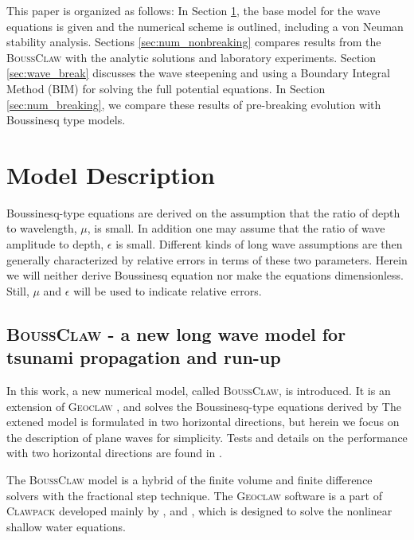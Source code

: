 \documentclass[review]{elsarticle}
\newcommand{\BoussClaw}{\textsc{BoussClaw} }
\newcommand{\BoussClawt}{\textsc{BoussClaw}}
\begin{document}
This paper is organized as follows: In Section \ref{sec:model}, the base model
for the wave equations is given and the numerical scheme is outlined, including a von Neuman stability analysis. 
Sections \ref{sec:num_nonbreaking} compares results from the \BoussClaw with
the analytic solutions and laboratory experiments. 
Section \ref{sec:wave_break} discusses the wave steepening and using a Boundary Integral Method (BIM) for 
solving the full potential equations. 
In Section \ref{sec:num_breaking}, 
we compare these results of pre-breaking
evolution with Boussinesq type models.

\section{Model Description}
\label{sec:model}

Boussinesq-type equations are   derived 
on the assumption that the ratio of depth to wavelength, $\mu$,
is small. In addition one may assume that 
the ratio of wave amplitude to depth, $\epsilon$ is small.
Different kinds of long wave assumptions are then generally characterized
by relative errors in terms of these two parameters.
Herein we will neither derive Boussinesq equation nor make the equations 
dimensionless. Still, $\mu$ and $\epsilon$ will be used to indicate relative errors.


\subsection{\BoussClaw - a new long wave model for tsunami propagation and run-up}
In this work, a new numerical model, 
called \BoussClawt, is introduced. 
It is an extension of \textsc{Geoclaw} \citep{clawpack},
and solves 
the Boussinesq-type equations derived by
The extened model is formulated in two horizontal directions, but herein we focus on the description of plane waves for simplicity. Tests and details on the 
performance with two horizontal directions are found in \cite{kim2014finite}.

The \BoussClaw model
is a hybrid of the finite volume and finite difference solvers
with the fractional step technique.
The \textsc{Geoclaw} software is 
a part of \textsc{Clawpack} \citep{clawpack}
developed mainly by
\citet{leveque1997wave}, \citet{george2008augmented}
and \citet{BergerGeorgeLeVequeMandli11},
which is designed to solve the nonlinear shallow water equations.


\end{document}
